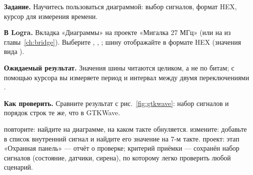\begin{diybox}
\textbf{Задание.} Научитесь пользоваться диаграммой: выбор сигналов, формат HEX, курсор для измерения времени.

\textbf{В Logra.} Вкладка «Диаграммы» на проекте «Мигалка 27 МГц» (или на  из главы~\ref{ch:bridge}). Выберите , , ; шину отображайте в формате HEX (значения вида ).

\textbf{Ожидаемый результат.} Значения шины читаются целиком, а не по битам; с помощью курсора вы измеряете период  и интервал между двумя переключениями .

\textbf{Как проверить.} Сравните результат с рис.~\ref{fig:gtkwave}: набор сигналов и порядок строк те же, что в GTKWave.

 повторите: найдите на диаграмме, на каком такте  обнуляется.  измените: добавьте в список внутренний сигнал и найдите его значение на 7-м такте.  проект: этап «Охранная панель» --- отчёт о проверке; критерий приёмки --- сохранён набор сигналов (состояние, датчики, сирена), по которому легко проверить любой сценарий.
\end{diybox}
